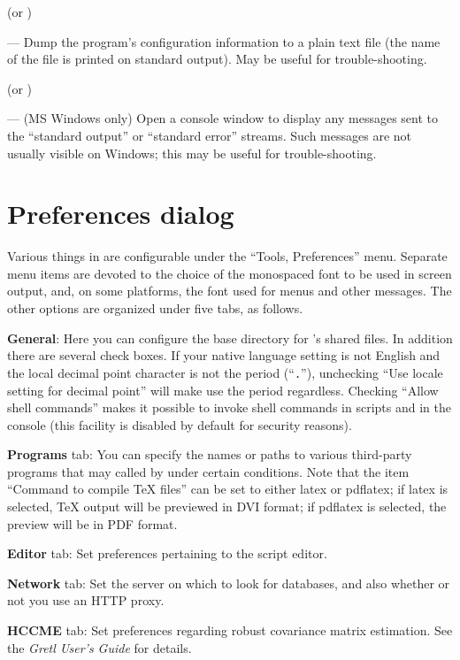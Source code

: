  (or )
      
--- Dump the program's configuration information to a plain text file
(the name of the file is printed on standard output).  May be useful
for trouble-shooting.
      
 (or )

--- (MS Windows only) Open a console window to display any messages
sent to the ``standard output'' or ``standard error'' streams.  Such
messages are not usually visible on Windows; this may be useful for
trouble-shooting.
      
\section{Preferences dialog}
\label{guiprefs}

Various things in  are configurable under the ``Tools,
Preferences'' menu.  Separate menu items are devoted to the choice of
the monospaced font to be used in  screen output, and, on
some platforms, the font used for menus and other messages.  The other
options are organized under five tabs, as follows.
      
\textbf{General}: Here you can configure the base directory for
's shared files. In addition there are several check
boxes. If your native language setting is not English and the local
decimal point character is not the period (``\texttt{.}''), unchecking
``Use locale setting for decimal point'' will make  use the
period regardless.  Checking ``Allow shell commands'' makes it
possible to invoke shell commands in scripts and in the 
console (this facility is disabled by default for security reasons).
      
\textbf{Programs} tab: You can specify the names or paths to various
third-party programs that may called by  under certain
conditions. Note that the item ``Command to compile {\TeX} files'' can
be set to either latex or pdflatex; if latex is selected, {\TeX}
output will be previewed in DVI format; if pdflatex is selected, the
preview will be in PDF format.

\textbf{Editor} tab: Set preferences pertaining to the 
script editor.

\textbf{Network} tab: Set the server on which to look for 
databases, and also whether or not you use an HTTP proxy.
      
\textbf{HCCME} tab: Set preferences regarding robust covariance matrix
estimation.  See the \emph{Gretl User's Guide} for details.
      
